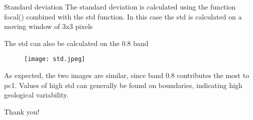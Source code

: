 \documentclass{beamer}
\begin{document}
\begin{frame}{Standard deviation}
  \tiny{The standard deviation is calculated using the function focal() combined with the std function. In this case the std is calculated on a moving window of 3x3 pixels}
     
  \tiny{The std can also be calculated on the 0.8 band}
  \begin{figure}
    \centering
    \texttt{[image: std.jpeg]}
  \end{figure}
  \tiny{As expected, the two images are similar, since band 0.8 contributes the most to pc1. Values of high std can generally be found on boundaries, indicating high geological variability. }
\end{frame}

\begin{frame}
\begin{center}
{\fontsize{30}{40}\selectfont Thank you!}
\end{center}
\end{frame}
\end{document}
